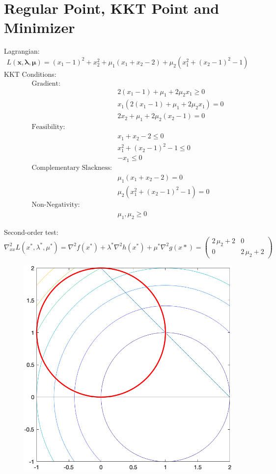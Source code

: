 \section{Regular Point, KKT Point and Minimizer}
Lagrangian:
\[
L(\bm{x, \lambda, \mu}) = (x_1 - 1)^2 + x_2^2 + \mu_1 (x_1 + x_2 - 2) + \mu_2(x_1^2 + (x_2 - 1)^2 - 1)
\]
KKT Conditions:
\begin{align*}
\text{Gradient:}&\\
& 2(x_1 - 1) + \mu_1 + 2\mu_2x_1\geq 0\\
& x_1(2(x_1 - 1) + \mu_1 + 2\mu_2x_1) = 0 \\
& 2x_2 + \mu_1 + 2\mu_2(x_2 - 1) = 0\\
\text{Feasibility:}&\\
& x_1 + x_2 - 2 \leq 0\\
& x_1^2 + (x_2 - 1)^2 - 1 \leq 0\\
& -x_1 \leq 0\\
\text{Complementary Slackness:}&\\
& \mu_1(x_1 + x_2 - 2) = 0\\
& \mu_2(x_1^2 + (x_2 - 1)^2 - 1) = 0\\
\text{Non-Negativity:}&\\
& \mu_1,\mu_2 \geq 0
\end{align*}


Second-order test:
\[
\nabla^2_{xx}L(x^*, \lambda^*, \mu^*) = \nabla^2f(x^*) + \lambda^* \nabla^2h(x^*) + \mu^* \nabla^2 g(x*) = \left(\begin{array}{cc}
2\,\mu_2 +2 & 0\\
0 & 2\,\mu_2 +2
\end{array}\right)
\]

\begin{figure}[h]
    \centering
    \includegraphics[width=0.5\linewidth]{hw7/prob4_plot.png}
    \label{fig:hw7_prob4_plot}
\end{figure}


